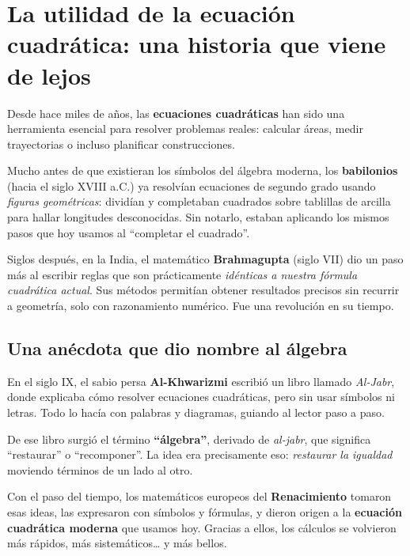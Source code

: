 
\vspace{0.5cm}

\vspace{1em}
\section*{La utilidad de la ecuación cuadrática: una historia que viene de lejos}

\begin{reseñaplana}
Desde hace miles de años, las \textbf{ecuaciones cuadráticas} han sido una herramienta esencial 
para resolver problemas reales: calcular áreas, medir trayectorias o incluso planificar construcciones.  

Mucho antes de que existieran los símbolos del álgebra moderna, los \textbf{babilonios} 
(hacia el siglo XVIII a.C.) ya resolvían ecuaciones de segundo grado usando \textit{figuras geométricas}: 
dividían y completaban cuadrados sobre tablillas de arcilla para hallar longitudes desconocidas. 
Sin notarlo, estaban aplicando los mismos pasos que hoy usamos al ``completar el cuadrado''.  

Siglos después, en la India, el matemático \textbf{Brahmagupta} (siglo VII) dio un paso más al escribir 
reglas que son prácticamente \textit{idénticas a nuestra fórmula cuadrática actual}. Sus métodos permitían 
obtener resultados precisos sin recurrir a geometría, solo con razonamiento numérico. Fue una revolución en su tiempo.
\end{reseñaplana}

\subsection*{Una anécdota que dio nombre al álgebra}

\begin{reseñaplana}
En el siglo IX, el sabio persa \textbf{Al-Khwarizmi} escribió un libro llamado \textit{Al-Jabr}, donde explicaba 
cómo resolver ecuaciones cuadráticas, pero sin usar símbolos ni letras.  Todo lo hacía con palabras y 
diagramas, guiando al lector paso a paso.  

De ese libro surgió el término \textbf{``álgebra''}, derivado de \textit{al-jabr}, que significa 
``restaurar'' o ``recomponer''.  La idea era precisamente eso: \textit{restaurar la igualdad} moviendo 
términos de un lado al otro.  

Con el paso del tiempo, los matemáticos europeos del \textbf{Renacimiento} tomaron esas ideas, 
las expresaron con símbolos y fórmulas, y dieron origen a la \textbf{ecuación cuadrática moderna} que usamos hoy.  
Gracias a ellos, los cálculos se volvieron más rápidos, más sistemáticos… y más bellos.
\end{reseñaplana}

